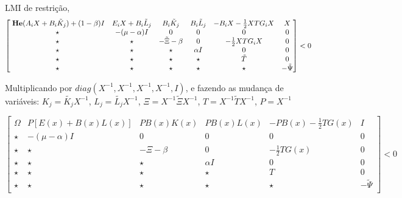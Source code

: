 LMI de restrição,
\begin{equation}
  \begin{bmatrix}
    \;\mathrm{\bf He}(A_i X + B_i \tilde K_j) + (1 - \beta) I & E_i X + B_i \tilde L_j & B_i \tilde K_j      & B_i \tilde L_j & -B_i X - \frac{1}{2} X TG_i X & X             \\
    \star                                         & -(\mu - \alpha)I          & 0                   & 0              & 0                             & 0             \\
    \star                                         & \star                     & -\tilde \Xi - \beta & 0              & -\frac{1}{2}XTG_iX           & 0             \\
    \star                                         & \star                     & \star               & \alpha I       & 0                             & 0             \\
    \star                                         & \star                     & \star               & \star          & \tilde T                      & 0             \\
    \star                                         & \star                     & \star               & \star          & \star                         & - \tilde \Psi \\
  \end{bmatrix} < 0
\end{equation}

Multiplicando por $diag(X^{-1}, X^{-1}, X^{-1}, X^{-1}, I)$, e fazendo as mudança de variáveis: $K_j = \tilde{K_j} X^{-1}$, $L_j = \tilde{L_j} X^{-1}$, $\Xi = X^{-1} \tilde \Xi X^{-1}$, $T = X^{-1} \tilde T X^{-1}$, $P =  X^{-1}$

\begin{equation}
  \begin{bmatrix}
    \Omega & P \left[E(x) + B(x)L(x)\right] & PB(x)K(x)    & PB(x)L(x) & -PB(x) - \frac{1}{2}TG(x) & I             \\
    \star  & -(\mu - \alpha)I               & 0            & 0         & 0                         & 0             \\
    \star  & \star                          & -\Xi - \beta & 0         & -\frac{1}{2}TG(x)         & 0             \\
    \star  & \star                          & \star        & \alpha I  & 0                         & 0             \\
    \star  & \star                          & \star        & \star     & T                         & 0             \\
    \star  & \star                          & \star        & \star     & \star                     & - \tilde \Psi \\
  \end{bmatrix} < 0
\end{equation}

